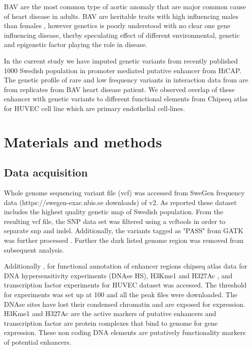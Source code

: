 \documentclass[11pt]{article} %
\begin{document}
BAV are the most common type of aortic anomaly that are major common cause of heart disease in adults. BAV are heritable traits with high influencing males than females , however genetics is poorly understood with no clear one gene influencing disease, therby speculating effect of different environmental, genetic and epigenetic factor playing the role in disease.

In the current study we have imputed genetic variants from recently published 1000 Swedish population in promoter mediated putative enhancer from HiCAP. The genetic profile of rare and low frequency variants in interaction data from  are from replicates from BAV heart disease patient. We observed overlap of these enhancer with genetic variants to different functional elements from Chipseq atlas for HUVEC cell line which are primary endothelial cell-lines. 



\section{Materials and methods}

\subsection{Data acquisition}
Whole genome sequencing variant file (vcf) was accessed from SweGen \cite{swegen}  frequency data (https://swegen-exac.nbis.se downloads) of v2. As reported these dataset includes the highest quality genetic map of Swedish population. From the resulting vcf file, the SNP data set was filtered using a vcftools \cite{danecek2011variaDNAsent} in order to separate  snp and indel. Additionally, the variants tagged as "PASS" from GATK \cite{gatk2} was further processed . Further the dark listed genome region \cite{li2014toward} was removed from subsequent analysis.

Additionally , for functional annotation of enhancer regions chipseq atlas \cite{Ohta} data  for DNA hypersensitivity experiments (DNAse HS), H3Kme1  and H327Ac , and transcription factor experiments for HUVEC dataset was accessed. The threshold for experiments was set up at 100 and all the peak files were downloaded.  The DNAse sites have lost their condensed chromatin and are exposed for expression. H3Kme1 and H327Ac are the active markers of  putative enhancers and transcription factor are protein complexes that bind to genome for gene expression. These non coding DNA elements  are putatively functionality markers of potential enhancers. 
\end{document}
